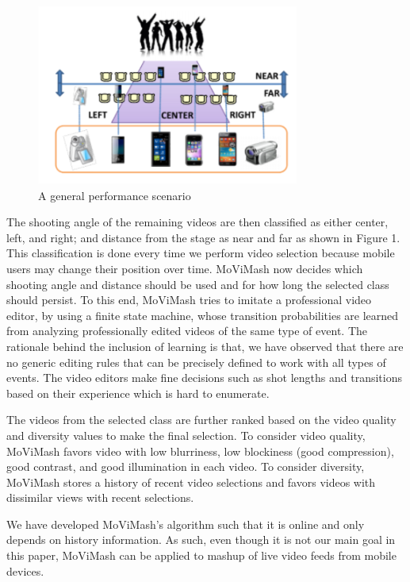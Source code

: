 \documentclass{sig-alternate-05-2015}
\begin{document}
\begin{figure}
\includegraphics[width=1\linewidth]{img1.png}
\caption{A general performance scenario}
\label{fig:block-diagram}
\end{figure}
The shooting angle of the remaining videos are then classified as
either center, left, and right; and distance from the stage as near and
far as shown in Figure 1. This classification is done every time we
perform video selection because mobile users may change their position over time. MoViMash now decides which shooting angle and
distance should be used and for how long the selected class should
persist. To this end, MoViMash tries to imitate a professional video
editor, by using a finite state machine, whose transition probabilities are learned from analyzing professionally edited videos of the
same type of event. The rationale behind the inclusion of learning is that, we have observed that there are no generic editing rules
that can be precisely defined to work with all types of events. The
video editors make fine decisions such as shot lengths and transitions based on their experience which is hard to enumerate.

The videos from the selected class are further ranked based on
the video quality and diversity values to make the final selection.
To consider video quality, MoViMash favors video with low blurriness, low blockiness (good compression), good contrast, and good
illumination in each video. To consider diversity, MoViMash stores
a history of recent video selections and favors videos with dissimilar views with recent selections.

We have developed MoViMash's algorithm such that it is online
and only depends on history information. As such, even though
it is not our main goal in this paper, MoViMash can be applied to
mashup of live video feeds from mobile devices.
\end{document}
